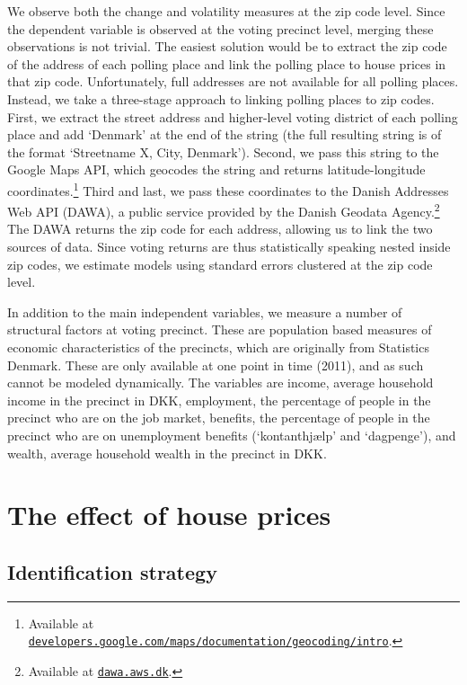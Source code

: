 \documentclass[12pt,a4paper]{article}
\begin{document}
We observe both the change and volatility measures at the zip code level. Since the dependent variable is observed at the voting precinct level, merging these observations is not trivial. The easiest solution would be to extract the zip code of the address of each polling place and link the polling place to house prices in that zip code. Unfortunately, full addresses are not available for all polling places. Instead, we take a three-stage approach to linking polling places to zip codes. First, we extract the street address and higher-level voting district of each polling place and add `Denmark' at the end of the string (the full resulting string is of the format `Streetname X, City, Denmark'). Second, we pass this string to the Google Maps API, which geocodes the string and returns latitude-longitude coordinates.\footnote{Available at \texttt{\href{https://developers.google.com/maps/documentation/geocoding/intro}{developers.google.com/maps/documentation/geocoding/intro}}.} Third and last, we pass these coordinates to the Danish Addresses Web API (DAWA), a public service provided by the Danish Geodata Agency.\footnote{Available at \texttt{\href{http://dawa.aws.dk/}{dawa.aws.dk}}.} The DAWA returns the zip code for each address, allowing us to link the two sources of data. Since voting returns are thus statistically speaking nested inside zip codes, we estimate models using standard errors clustered at the zip code level.

In addition to the main independent variables, we measure a number of structural factors at voting precinct. These are population based measures of economic characteristics of the precincts, which are originally from Statistics Denmark. These are only available at one point in time (2011), and as such cannot be modeled dynamically. The variables are income, average household income in the precinct in DKK, employment, the percentage of people in the precinct who are on the job market, benefits, the percentage of people in the precinct who are on unemployment benefits (`kontanthjælp' and `dagpenge'), and wealth, average household wealth in the precinct in DKK.  


\section{The effect of house prices}

\subsection{Identification strategy}
\end{document}
